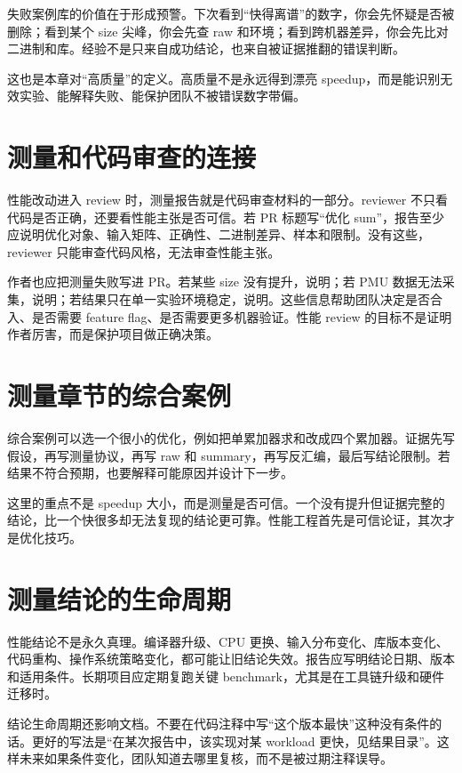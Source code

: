 失败案例库的价值在于形成预警。下次看到“快得离谱”的数字，你会先怀疑是否被删除；看到某个 size 尖峰，你会先查 raw 和环境；看到跨机器差异，你会先比对二进制和库。经验不是只来自成功结论，也来自被证据推翻的错误判断。

这也是本章对“高质量”的定义。高质量不是永远得到漂亮 speedup，而是能识别无效实验、能解释失败、能保护团队不被错误数字带偏。

\section{测量和代码审查的连接}

性能改动进入 review 时，测量报告就是代码审查材料的一部分。reviewer 不只看代码是否正确，还要看性能主张是否可信。若 PR 标题写“优化 sum”，报告至少应说明优化对象、输入矩阵、正确性、二进制差异、样本和限制。没有这些，reviewer 只能审查代码风格，无法审查性能主张。

作者也应把测量失败写进 PR。若某些 size 没有提升，说明；若 PMU 数据无法采集，说明；若结果只在单一实验环境稳定，说明。这些信息帮助团队决定是否合入、是否需要 feature flag、是否需要更多机器验证。性能 review 的目标不是证明作者厉害，而是保护项目做正确决策。

\section{测量章节的综合案例}

综合案例可以选一个很小的优化，例如把单累加器求和改成四个累加器。证据先写假设，再写测量协议，再写 raw 和 summary，再写反汇编，最后写结论限制。若结果不符合预期，也要解释可能原因并设计下一步。

这里的重点不是 speedup 大小，而是测量是否可信。一个没有提升但证据完整的结论，比一个快很多却无法复现的结论更可靠。性能工程首先是可信论证，其次才是优化技巧。

\section{测量结论的生命周期}

性能结论不是永久真理。编译器升级、CPU 更换、输入分布变化、库版本变化、代码重构、操作系统策略变化，都可能让旧结论失效。报告应写明结论日期、版本和适用条件。长期项目应定期复跑关键 benchmark，尤其是在工具链升级和硬件迁移时。

结论生命周期还影响文档。不要在代码注释中写“这个版本最快”这种没有条件的话。更好的写法是“在某次报告中，该实现对某 workload 更快，见结果目录”。这样未来如果条件变化，团队知道去哪里复核，而不是被过期注释误导。

